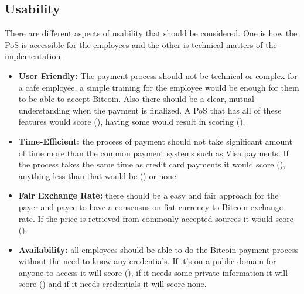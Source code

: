 \subsection{Usability} There are different aspects of usability that should be considered. One is how the PoS is accessible for the employees and the other is technical matters of the implementation.
\begin{itemize}

\item \textbf{User Friendly: }The payment process should not be technical or complex for a cafe employee, a simple training for the employee would be enough for them to be able to accept Bitcoin. Also there should be a clear, mutual understanding when the payment is finalized. A PoS that has all of these features would score (\full), having some would result in scoring (\prt).

\item \textbf{Time-Efficient: }the process of payment should not take significant amount of time more than the common payment systems such as Visa payments. If the process takes the same time as credit card payments it would score (\full), anything less than that would be (\prt) or none.

\item \textbf{Fair Exchange Rate: }there should be a easy and fair approach for the payer and payee to have a consensus on fiat currency to Bitcoin exchange rate. If the price is retrieved from commonly accepted sources it would score (\full).

\item \textbf{Availability: }all employees should be able to do the Bitcoin payment process without the need to know any credentials. If it's on a public domain for anyone to access it will score (\full), if it needs some private information it will score (\prt) and if it needs credentials it will score none.

\end{itemize}
